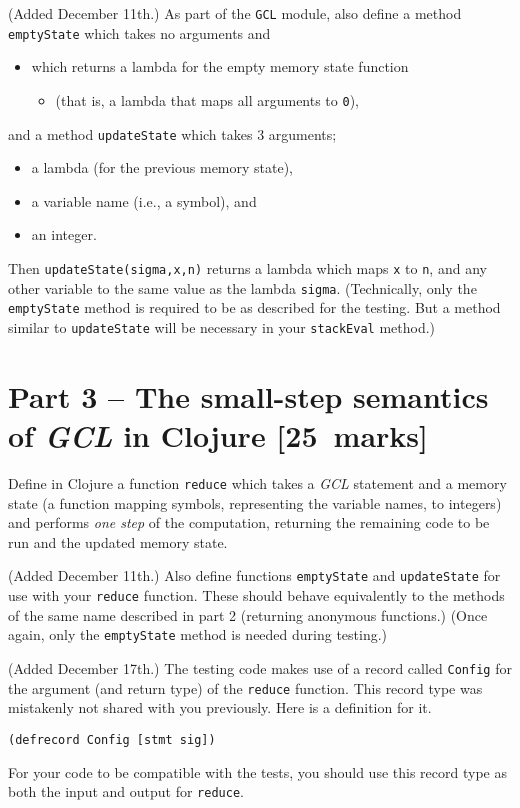 \documentclass[11pt]{article}
\theoremstyle{definition}
\begin{document}
(Added December 11th.)
As part of the \texttt{GCL} module,
also define a method \texttt{emptyState} which takes no arguments and
\begin{itemize}
\item which returns a lambda for the empty memory state function
\begin{itemize}
\item (that is, a lambda that maps all arguments to \texttt{0}),
\end{itemize}
\end{itemize}
and a method \texttt{updateState} which takes 3 arguments;
\begin{itemize}
\item a lambda (for the previous memory state),
\item a variable name (i.e., a symbol), and
\item an integer.
\end{itemize}
Then \texttt{updateState(sigma,x,n)} returns a lambda
which maps \texttt{x} to \texttt{n}, and any other variable
to the same value as the lambda \texttt{sigma}.
(Technically, only the \texttt{emptyState} method is required to be
 as described for the testing.
 But a method similar to \texttt{updateState} will be necessary
 in your \texttt{stackEval} method.)

\section*{Part 3 – The small-step semantics of \emph{GCL} in Clojure   [25 marks]}
\label{sec:orgd8bcdd2}
Define in Clojure a function \texttt{reduce} which takes
a \emph{GCL} statement and a memory state
(a function mapping symbols, representing the variable names, to integers)
and performs \emph{one step} of the computation, returning the
remaining code to be run and the updated memory state.

(Added December 11th.)
Also define functions \texttt{emptyState} and \texttt{updateState} for use
with your \texttt{reduce} function.
These should behave equivalently to the methods of the same name
described in part 2 (returning anonymous functions.)
(Once again, only the \texttt{emptyState} method is needed
 during testing.)

(Added December 17th.)
The testing code makes use of a record called \texttt{Config} for the
argument (and return type) of the \texttt{reduce} function.
This record type was mistakenly not shared with you previously.
Here is a definition for it.
\begin{verbatim}
(defrecord Config [stmt sig])
\end{verbatim}
For your code to be compatible with the tests, you should
use this record type as both the input and output for \texttt{reduce}.
\end{document}
